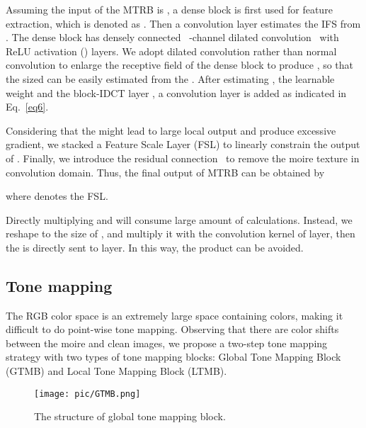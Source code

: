 \documentclass[10pt,twocolumn,letterpaper]{article}
\begin{document}
Assuming the input of the MTRB is , a dense block is first used for feature extraction, which is denoted as . Then a  convolution layer estimates the IFS  from .
The dense block has  densely connected~\cite{DenseNet}   -channel dilated convolution~\cite{DILATED_CONV} with ReLU activation () layers. 
We adopt dilated convolution rather than normal convolution to enlarge the receptive field of the dense block to produce , so that the  sized  can be easily estimated from the .
After estimating , the learnable weight  and the block-IDCT layer , a convolution layer  is added as indicated in Eq.~\ref{eq6}. 

Considering that the  might lead to large local output and produce excessive gradient, we stacked a Feature Scale Layer (FSL) to linearly constrain the output of . 
Finally, we introduce the residual connection~\cite{ResNet} to remove the moire texture in convolution domain. Thus, the final output of MTRB  can be obtained by

where  denotes the FSL. 

Directly multiplying  and  will consume large amount of calculations. Instead, we reshape  to the size of , and multiply it with the convolution kernel of  layer, then the  is directly sent to  layer. In this way, the product  can be avoided.

\subsection{Tone mapping}
\label{sec3_3}
The RGB color space is an extremely large space containing  colors, making it difficult to do point-wise tone mapping. 
Observing that there are color shifts between the moire and clean images, we  propose a two-step tone mapping strategy with two types of tone mapping blocks: Global Tone Mapping Block (GTMB) and Local Tone Mapping Block (LTMB).

\begin{figure}[t]
	\centering
	\texttt{[image: pic/GTMB.png]}
	\caption{The structure of global tone mapping block.}
	\label{GTMB}
\end{figure}
\end{document}
